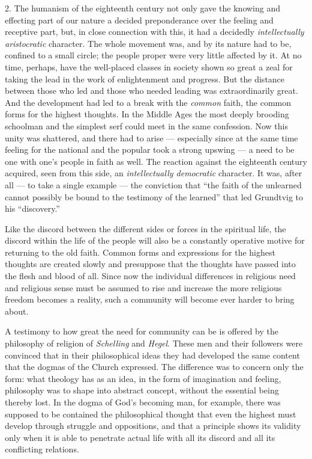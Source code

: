 \documentclass[12pt,a4paper,openany]{book}
\newcommand{\opage}[1]{\marginnote{\footnotesize\textit{[#1]}}}
\begin{document}
2. The humanism of the eighteenth century not only gave the knowing
and effecting part of our nature a decided preponderance over the feeling and
receptive part, but, in close connection with this, it had a decidedly
\emph{intellectually aristocratic} character. The whole movement was, and by its
nature had to be, confined to a small circle; the people proper were very
little affected by it. At no time, perhaps, have the well-placed classes in
society shown so great a zeal for taking the lead in the
\opage{206}work of enlightenment
and progress. But the distance between those who led and those who needed
leading was extraordinarily great. And the development had led to a break with
the \emph{common} faith, the common forms for the highest thoughts. In the Middle
Ages the most deeply brooding schoolman and the simplest serf could meet in
the same confession. Now this unity was shattered, and there had to arise ---
especially since at the same time feeling for the national and the popular took
a strong upswing --- a need to be one with one's people in faith as well. The
reaction against the eighteenth century acquired, seen from this side, an
\emph{intellectually democratic} character. It was, after all --- to take a single
example --- the conviction that ``the faith of the unlearned cannot possibly be
bound to the testimony of the learned'' that led Grundtvig to his
``discovery.''

Like the discord between the different sides or forces in the spiritual life,
the discord within the life of the people will also be a constantly operative
motive for returning to the old faith. Common forms and expressions for the
highest thoughts are created slowly and presuppose that the thoughts have
passed into the flesh and blood of all. Since now the individual differences
in religious need and religious sense must be assumed to rise and increase the
more religious freedom becomes a reality, such a community will become ever
harder to bring about.

A testimony to how great the need for community can be is offered by the
philosophy of religion of \emph{Schelling} and \emph{Hegel}. These men and their followers
were convinced that in their philosophical ideas they had developed the same
content that the dogmas of the Church expressed. The difference was to concern
only the form: what theology has as an idea, in the form of imagination
and feeling, philosophy was to shape into abstract concept, without the
essential being thereby lost. In the dogma of God's becoming man, for example,
there was supposed to be contained the philosophical thought that even the
highest must develop through struggle and oppositions, and that a principle
shows its validity only when it is able to penetrate actual life with all its
discord and all its conflicting relations.
\end{document}
